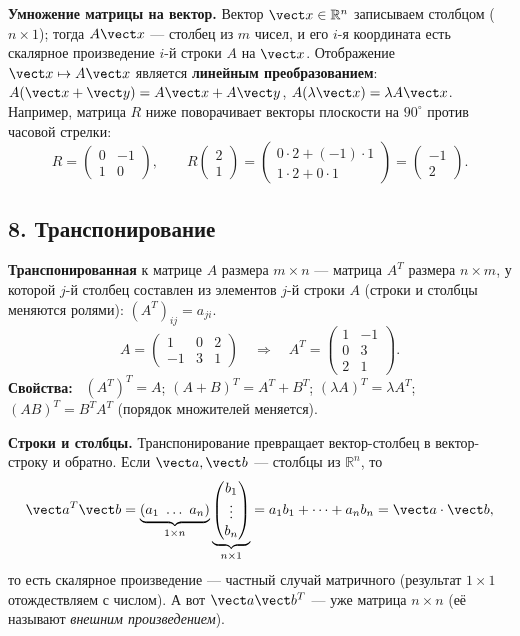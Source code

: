 \textbf{Умножение матрицы на вектор.} Вектор $\vect x\in\mathbb R^n$ записываем столбцом ($n\times1$); тогда $A\vect x$ --- столбец из $m$ чисел, и его $i$-я координата есть скалярное произведение $i$-й строки $A$ на $\vect x$. Отображение $\vect x\mapsto A\vect x$ является \textbf{линейным преобразованием}: $A(\vect x+\vect y)=A\vect x+A\vect y$, $A(\lambda\vect x)=\lambda A\vect x$. Например, матрица $R$ ниже поворачивает векторы плоскости на $90^\circ$ против часовой стрелки:
\[
R=\begin{pmatrix}0&-1\\1&0\end{pmatrix},\qquad
R\begin{pmatrix}2\\1\end{pmatrix}=\begin{pmatrix}0\cdot2+(-1)\cdot1\\1\cdot2+0\cdot1\end{pmatrix}=\begin{pmatrix}-1\\2\end{pmatrix}.
\]

\subsection*{8. Транспонирование}
\textbf{Транспонированная} к матрице $A$ размера $m\times n$ --- матрица $A^T$ размера $n\times m$, у которой $j$-й столбец составлен из элементов $j$-й строки $A$ (строки и столбцы меняются ролями): $(A^T)_{ij}=a_{ji}$.
\[
A=\begin{pmatrix}1&0&2\\-1&3&1\end{pmatrix}\quad\Longrightarrow\quad A^T=\begin{pmatrix}1&-1\\0&3\\2&1\end{pmatrix}.
\]
\textbf{Свойства:} \ $(A^T)^T=A$; \quad $(A+B)^T=A^T+B^T$; \quad $(\lambda A)^T=\lambda A^T$; \quad $(AB)^T=B^TA^T$ (порядок множителей меняется).

\textbf{Строки и столбцы.} Транспонирование превращает вектор-столбец в вектор-строку и обратно. Если $\vect a,\vect b$ --- столбцы из $\mathbb R^n$, то
\[
\vect a^T\vect b=\underbrace{(a_1\ \dots\ a_n)}_{1\times n}\underbrace{\begin{pmatrix}b_1\\\vdots\\b_n\end{pmatrix}}_{n\times1}=a_1b_1+\dots+a_nb_n=\vect a\cdot\vect b,
\]
то есть скалярное произведение --- частный случай матричного (результат $1\times1$ отождествляем с числом). А вот $\vect a\vect b^T$ --- уже матрица $n\times n$ (её называют \emph{внешним произведением}).
